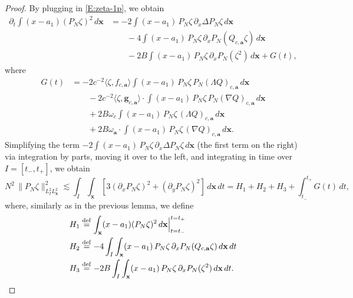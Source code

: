 \documentclass[12pt,letterpaper]{amsart}
\newcommand{\la}{\langle}
\newcommand{\ra}{\rangle}
\newcommand{\defeq}{\stackrel{\rm{def}}{=}}
\theoremstyle{remark}
\numberwithin{equation}{section}
\numberwithin{theorem}{section}
\numberwithin{table}{section}
\begin{document}
\begin{proof}
By plugging in \eqref{E:zeta-1p}, we obtain
\begin{align*}
\partial_t \int (x-a_1) (P_N \zeta)^2 \, d\mathbf{x} 
&= -2 \int (x-a_1) \, P_N \zeta \, \partial_x \Delta P_N \zeta \, d\mathbf{x} \\
& \qquad - 4 \int (x-a_1) \, P_N \zeta \, \partial_x P_N ( Q_{c,\mathbf{a}} \zeta) \, d\mathbf{x} \\
& \qquad - 2 B \int (x-a_1) \, P_N \zeta \, \partial_x P_N ( \zeta^2) \, d \mathbf{x} + G(t),
\end{align*}
where
\begin{align*}
G(t) &= -2 c^{-2} \la \zeta, f_{c,\mathbf{a}}\ra  \int (x-a_1) \, P_N \zeta \, P_N (\Lambda Q)_{c,\mathbf{a}} \, d\mathbf{x} \\
& \qquad -2 c^{-2} \la \zeta, \mathbf{g}_{c,\mathbf{a}} \ra  \cdot  \int (x-a_1) \, P_N \zeta \, P_N (\nabla Q)_{c,\mathbf{a}} \, d\mathbf{x}  \\
& \qquad + 2B \omega_c \int (x-a_1) \, P_N\zeta \, ( \Lambda Q)_{c,\mathbf{a}} \, d\mathbf{x} \\
& \qquad + 2B \omega_{\mathbf{a}} \cdot \int (x-a_1) \, P_N \zeta \, (\nabla Q)_{c,\mathbf{a}} \, d \mathbf{x}.
\end{align*}
Simplifying the term $-2 \int (x-a_1) \, P_N \zeta \, \partial_x \Delta P_N \zeta \, d\mathbf{x}$ (the first term on the right) via integration by parts, moving it over to the left, and integrating in time over $I=[t_-,t_+]$, we obtain
\begin{equation}
\label{E:stuff1}
N^2 \, \| P_N \zeta \|_{L_I^2 L_{\mathbf{x}}^2}^2 \lesssim \int_I\int_{\mathbf{x}} [3 (\partial_x P_N \zeta)^2 + (\partial_y P_N\zeta)^2]  \, d\mathbf{x} \, dt = H_1+H_2+H_3 + \int_{t_-}^{t_+}G(t) \,dt,
\end{equation}
where, similarly as in the previous lemma, we define
\begin{align*}
H_1 &\defeq \int_{\mathbf{x}} (x-a_1) (P_N \zeta)^2 \, d\mathbf{x}  \Big|^{t=t_+}_{t=t_-}  \\
H_2 &\defeq - 4 \int_I \int_{\mathbf{x}} (x-a_1) \, P_N \zeta \, \partial_x P_N ( Q_{c,\mathbf{a}} \zeta) \, d\mathbf{x} \, dt \\
H_3 &\defeq - 2 B \int_I \int_{\mathbf{x}} (x-a_1) \, P_N \zeta \, \partial_x P_N ( \zeta^2) \, d \mathbf{x} \, dt.
\end{align*}


\end{proof}
\end{document}
